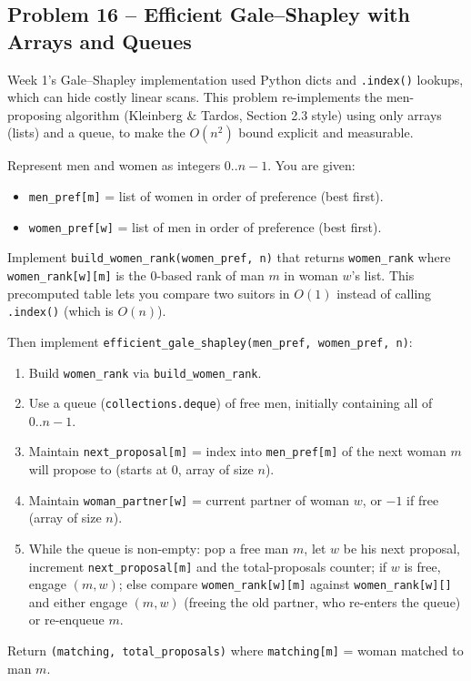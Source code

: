 \documentclass[11pt]{article}
\begin{document}
\subsection*{Problem 16 -- Efficient Gale--Shapley with Arrays and Queues}

Week 1's Gale--Shapley implementation used Python dicts and \texttt{.index()} lookups,
which can hide costly linear scans. This problem re-implements the men-proposing algorithm
(Kleinberg \& Tardos, Section 2.3 style) using only arrays (lists) and a queue, to make the
$O(n^2)$ bound explicit and measurable.

Represent men and women as integers $0..n-1$. You are given:
\begin{itemize}
    \item \texttt{men\_pref[m]} = list of women in order of preference (best first).
    \item \texttt{women\_pref[w]} = list of men in order of preference (best first).
\end{itemize}

Implement \texttt{build\_women\_rank(women\_pref, n)} that returns \texttt{women\_rank}
where \texttt{women\_rank[w][m]} is the 0-based rank of man $m$ in woman $w$'s list. This
precomputed table lets you compare two suitors in $O(1)$ instead of calling
\texttt{.index()} (which is $O(n)$).

Then implement \texttt{efficient\_gale\_shapley(men\_pref, women\_pref, n)}:
\begin{enumerate}
    \item Build \texttt{women\_rank} via \texttt{build\_women\_rank}.
    \item Use a queue (\texttt{collections.deque}) of free men, initially containing all
    of $0..n-1$.
    \item Maintain \texttt{next\_proposal[m]} = index into \texttt{men\_pref[m]} of the
    next woman $m$ will propose to (starts at $0$, array of size $n$).
    \item Maintain \texttt{woman\_partner[w]} = current partner of woman $w$, or $-1$ if
    free (array of size $n$).
    \item While the queue is non-empty: pop a free man $m$, let $w$ be his next proposal,
    increment \texttt{next\_proposal[m]} and the total-proposals counter; if $w$ is free,
    engage $(m,w)$; else compare \texttt{women\_rank[w][m]} against
    \texttt{women\_rank[w][]} and either engage $(m,w)$ (freeing the
    old partner, who re-enters the queue) or re-enqueue $m$.
\end{enumerate}
Return \texttt{(matching, total\_proposals)} where \texttt{matching[m]} = woman matched to
man $m$.
\end{document}
